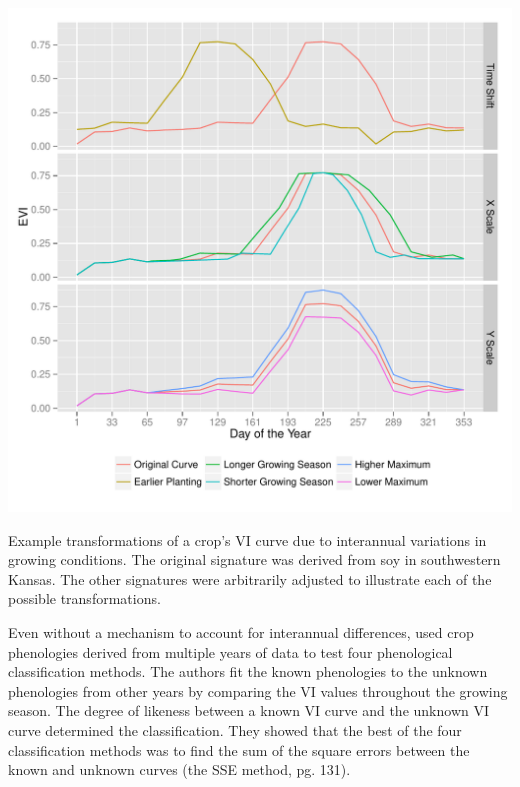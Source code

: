 \begin{ssfigure}
  \centering
  \includegraphics[width=\textwidth]{Graphics/transformations.pdf}
  \caption[Example transformations of a crop's VI curve due to interannual variations in growing conditions.]{Example transformations of a crop's VI curve due to interannual variations in growing conditions. The original signature was derived from soy in southwestern Kansas. The other signatures were arbitrarily adjusted to illustrate each of the possible transformations.}
  \label{fig:transformations}
\end{ssfigure}

Even without a mechanism to account for interannual differences, \textcite{brown2007multitemporal} used crop phenologies derived from multiple years of data to test four phenological classification methods. The authors fit the known phenologies to the unknown phenologies from other years by comparing the VI values throughout the growing season. The degree of likeness between a known VI curve and the unknown VI curve determined the classification. They showed that the best of the four classification methods was to find the sum of the square errors between the known and unknown curves (the SSE method, \citeauthor{brown2007multitemporal} pg. 131).

